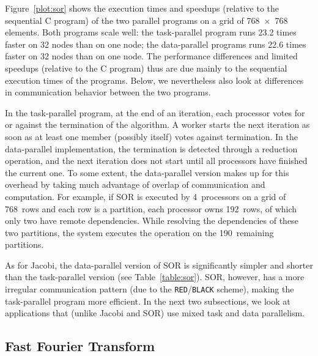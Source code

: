 \documentclass{acmtrans2e}
\begin{document}
Figure~\ref{plot:sor} shows the execution times and speedups (relative
to the sequential C program) of the two parallel
programs on a grid of 768~$\times$~768 elements.
Both programs scale well:
the task-parallel program runs 23.2 times faster on 32 nodes than on
one node; the data-parallel programs runs 22.6 times faster on 32
nodes than on one node.
The performance differences and limited speedups (relative to the C program)
thus are due mainly to the sequential execution times of the programs.
Below, we nevertheless also look at differences in communication behavior
between the two programs.

In the task-parallel program, at the end of an
iteration, each processor votes for or against the termination of the
algorithm. A worker starts the next iteration as soon as at least one
member (possibly itself) votes against termination. In the data-parallel
implementation, the termination is detected through a
reduction operation, and the next iteration does not start until all
processors have finished the current one.
To some extent, the data-parallel version makes up for this overhead
by taking much advantage of overlap of communication and
computation. For example, if SOR is executed by 4~processors on a grid
of 768~rows and each row is a partition, each processor owns 192~rows,
of which only two have remote dependencies. While resolving the
dependencies of these two partitions, the system executes the
operation on the 190~remaining partitions.

As for Jacobi, the data-parallel version of SOR is significantly
simpler and shorter than the task-parallel version (see Table~\ref{table:sor}).
SOR, however, has a more irregular communication pattern (due to
the \verb+RED+/\verb+BLACK+ scheme), making the task-parallel program
more efficient.
In the next two subsections, we look at applications that (unlike Jacobi
and SOR) use mixed task and data parallelism.

\subsection{Fast Fourier Transform}
\end{document}
